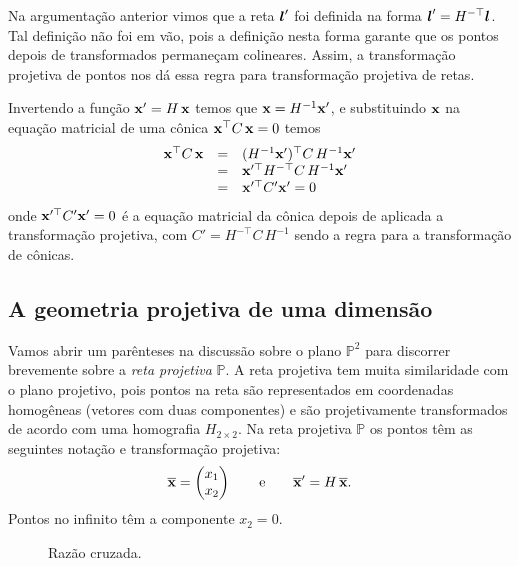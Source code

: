 
Na argumentação anterior vimos que a reta $\boldsymbol{l}'$ foi definida na forma $\boldsymbol{l}'=H^{-\top}\boldsymbol{l}$. Tal definição não foi em vão, pois a definição nesta forma garante que os pontos depois de transformados permaneçam colineares. Assim, a transformação projetiva de pontos nos dá essa regra para transformação projetiva de retas.\\


Invertendo a função $\mathbf{x}'=H\,\mathbf{x}$ temos que $\mathbf{x}=H^{-1}\mathbf{x}'$, e substituindo $\mathbf{x}$ na equação matricial de uma cônica $\mathbf{x}^\top C\,\mathbf{x}=0$ temos
\begin{equation*}
\begin{array}{rcl}
\mathbf{x}^\top C\,\mathbf{x}&=&(H^{-1}\mathbf{x}')^\top C\,H^{-1}\mathbf{x}'\\
&=&\mathbf{x}'^\top H^{-\top}C\,H^{-1}\mathbf{x}'\\
&=&\mathbf{x}'^\top C'\mathbf{x}'=0
\end{array}
\end{equation*}
onde $\mathbf{x}'^\top C'\mathbf{x}'=0$ é a equação matricial da cônica depois de aplicada a transformação projetiva, com $C'=H^{-\top}C\,H^{-1}$ sendo a regra para a transformação de cônicas.
\subsection{A geometria projetiva de uma dimensão}\label{sec.geometria-1D}
Vamos abrir um parênteses na discussão sobre o plano ${\mathbb{P}^2}$ para discorrer brevemente sobre a {\it reta projetiva} ${\mathbb{P}}$. A reta projetiva tem muita similaridade com o plano projetivo, pois pontos na reta são representados em coordenadas homogêneas (vetores com duas componentes) e são projetivamente transformados de acordo com uma homografia $H_{2\times2}$. Na reta projetiva ${\mathbb{P}}$ os pontos têm as seguintes notação e transformação projetiva: 
\begin{equation}\label{eq.ponto-homografia-em-P}
\overline{\mathbf{x}}=
\begin{pmatrix}
x_1\\
x_2
\end{pmatrix}
\qquad\text{e}\qquad
\overline{\mathbf{x}}'=H\,\overline{\mathbf{x}}.
\end{equation}
Pontos no infinito têm a componente $x_2=0$.
\begin{figure}[!htb]{\textwidth}
\caption{Razão cruzada.}
\hfill
{}\hfill
{}
\label{fig.razao-cruzada}
\end{figure}
